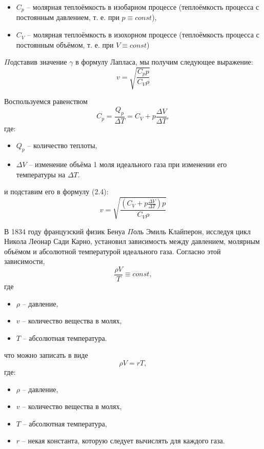 \documentclass[referat,times]{SCWorks}
\begin{document}
\begin{itemize}
    \item $C_p$ -- молярная теплоёмкость в изобарном процессе (теплоёмкость процесса с постоянным давлением, т. е. при $p \equiv const$),
    \item $C_V$ -- молярная теплоёмкость в изохорном процессе (теплоёмкость процесса с постоянным объёмом, т. е. при $V \equiv const$)
\end{itemize}
\par $\Pi$одставив значение $\gamma$ в формулу Лапласа, мы получим следующее выражение:
\begin{equation}
    v = \sqrt{\frac{C_p p}{C_V \rho}}
\end{equation}
\par Воспользуемся равенством
\begin{equation}
    C_p = \frac{Q_p}{\Delta T} = C_V + p \frac{\Delta V}{\Delta T},
\end{equation}
где:
\begin{itemize}
    \item $Q_p$ -- количество теплоты,
    \item $\Delta V$ -- изменение объёма 1 моля идеального газа при изменении его температуры на $\Delta T$.
\end{itemize}
\par и подставим его в формулу (2.4):
\begin{equation}
    v = \sqrt{\frac{(C_V + p \frac{\Delta V}{\Delta T}) p}{C_V \rho}}
\end{equation}
\par В 1834 году французский физик Бенуа $\Pi$оль Эмиль Клайперон\cite{KLAYPERON_BIO}, исследуя цикл Никола Леонар Сади Карно, установил зависимость между давлением, молярным объёмом и абсолютной температурой идеального газа. Согласно этой зависимости,
\begin{equation}
    \frac{\rho V}{T} \equiv const,
\end{equation}
где
\begin{itemize}
    \item $\rho$ -- давление,
    \item $v$ -- количество вещества в молях,
    \item $T$ -- абсолютная температура.
\end{itemize}
что можно записать в виде
\begin{equation}
    \rho V = r T,
\end{equation}
где:
\begin{itemize}
    \item $\rho$ -- давление,
    \item $v$ -- количество вещества в молях,
    \item $T$ -- абсолютная температура,
    \item $r$ -- некая константа, которую следует вычислять для каждого газа.
\end{itemize}
\end{document}
